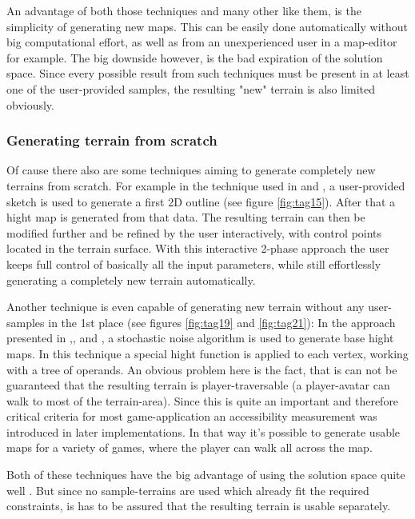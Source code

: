 An advantage of both those techniques and many other like them, is the simplicity of generating new maps. This can be easily done automatically without big computational effort, as well as from an unexperienced user in a map-editor for example. The big downside however, is the bad expiration of the solution space. Since every possible result from such techniques must be present in at least one of the user-provided samples, the resulting "new" terrain is also limited obviously.

\subsubsection{Generating terrain from scratch}
Of cause there also are some techniques aiming to generate completely new terrains from scratch. For example in the technique used in \cite{ong2005terrain} and \cite{saunders2006realistic}, a user-provided sketch is used to generate a first 2D outline (see figure \ref{fig:tag15}). After that a hight map is generated from that data. The resulting terrain can then be modified further and be refined by the user interactively, with control points located in the terrain surface. With this interactive 2-phase approach the user keeps full control of basically all the input parameters, while still effortlessly generating a completely new terrain automatically.

Another technique is even capable of generating new terrain without any user-samples in the 1st place (see figures \ref{fig:tag19} and \ref{fig:tag21}): In the approach presented in \cite{frade2009breeding},\cite{frade2010evolution1},\cite{frade2010evolution2} and \cite{rodrigues2010development}, a stochastic noise algorithm is used to generate base hight maps. In this technique a special hight function is applied to each vertex, working with a tree of operands. An obvious problem here is the fact, that is can not be guaranteed that the resulting terrain is player-traversable (a player-avatar can walk to most of the terrain-area). Since this is quite an important and therefore critical criteria for most game-application an accessibility measurement was introduced in later implementations. In that way it's possible to generate usable maps for a variety of games, where the player can walk all across the map.

Both of these techniques have the big advantage of using the solution space quite well \cite{raffe2012survey}. But since no sample-terrains are used which already fit the required constraints, is has to be assured that the resulting terrain is usable separately.

